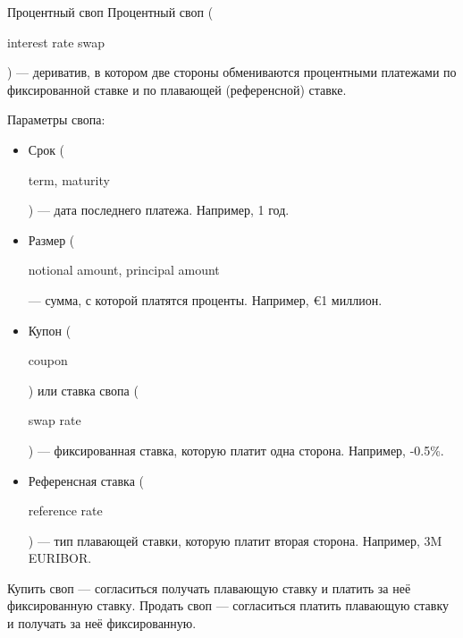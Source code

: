 \documentclass{beamer}
\renewcommand{\EUR}[1]{\textup{\euro}#1}
\newcommand{\en}[1]{\begin{otherlanguage}{english}#1\end{otherlanguage}}
\begin{document}
\begin{frame}{Процентный своп}
\justify
Процентный своп (\en{interest rate swap}) --- дериватив, в котором две стороны 
обмениваются процентными платежами по фиксированной ставке и по плавающей (референсной) 
ставке. 

\justify
Параметры свопа:
\begin{itemize}
\justifying
\item Срок (\en{term, maturity}) --- дата последнего платежа. Например, 1 год.
\item Размер (\en{notional amount, principal amount} --- сумма, с которой платятся проценты. Например, \EUR{1} миллион.
\item Купон (\en{coupon}) или ставка свопа (\en{swap rate}) --- фиксированная ставка, которую платит одна сторона. Например, -0.5\%.
\item Референсная ставка (\en{reference rate}) --- тип плавающей ставки, которую платит вторая сторона. Например, 3M EURIBOR.
\end{itemize}

\justify
Купить своп --- согласиться получать плавающую ставку и платить за неё фиксированную ставку. Продать своп --- согласиться платить плавающую ставку и получать за неё фиксированную.
\end{frame}
\end{document}
